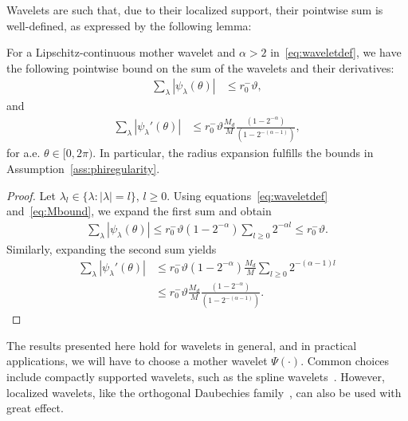 Wavelets are such that, due to their localized support, their pointwise sum is well-defined, as expressed by the following lemma:
\begin{lemma} \label{lem:poitwisesum}
For a Lipschitz-continuous mother wavelet and $\alpha>2$ in~\eqref{eq:waveletdef}, we have the following pointwise bound on the sum of the wavelets and their derivatives:
\begin{align*}
    \sum_\lambda | \psi_\lambda(\theta) | &\leq r_0^-\vartheta,
\end{align*}
and
\begin{align*}
    \sum_\lambda | \psi_\lambda'(\theta ) | &\leq r_0^-\vartheta \frac{M_d}{M}\frac{\left( 1-2^{-\alpha}\right)}{\left( 1-2^{-(\alpha-1)}\right)},
\end{align*}
for a.e. $\theta \in [0,2\pi)$.
In particular, the radius expansion fulfills the bounds in Assumption~\ref{ass:phiregularity}.
\end{lemma}
\begin{proof}
    Let $\lambda_l\in \{ \lambda : |\lambda|=l \}$, $l\geq 0$.
    Using equations~\eqref{eq:waveletdef} and~\eqref{eq:Mbound}, we expand the first sum and obtain
    \begin{align}
        \sum_\lambda | \psi_\lambda(\theta) |
        \leq r_0^-\vartheta(1-2^{-\alpha}) \sum_{l\geq 0} 2^{-\alpha l}
        \leq r_0^-\vartheta. \label{eq:pointwiseone}
    \end{align}
    Similarly, expanding the second sum yields
    \begin{align}
        \sum_\lambda | \psi_\lambda'(\theta) |
        &\leq r_0^-\vartheta(1-2^{-\alpha}) \frac{M_d}{M} \sum_{l\geq 0} 2^{-(\alpha-1) l}\nonumber\\
        &\leq r_0^-\vartheta \frac{M_d}{M}\frac{\left(1-2^{-\alpha}\right)}{\left(  1-2^{-(\alpha-1)}\right)}.\label{eq:pointwisetwo}
    \end{align}
\end{proof}

The results presented here hold for wavelets in general, and in practical applications, we will have to choose a mother wavelet $\Psi(\cdot)$.
Common choices include compactly supported wavelets, such as the spline wavelets~\cite{unser1997}.
However, localized wavelets, like the orthogonal Daubechies family~\cite{daubechies1988}, can also be used with great effect.